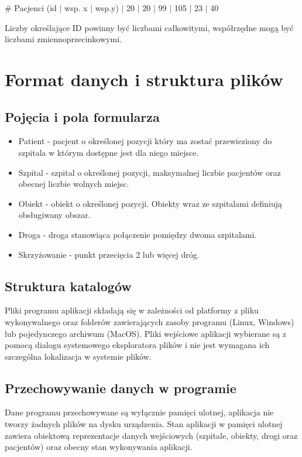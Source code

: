 \documentclass{article}
\begin{document}
\begin{tcolorbox}[title={Przykładowy plik zawierający dane pacjentów potrzebujących wolnego łóżka w szpitalu.}]
\# Pacjenci (id $|$ wsp. x $|$ wsp.y)
 $|$ 20 $|$ 20
 $|$ 99 $|$ 105
 $|$ 23 $|$ 40
\end{tcolorbox}
Liczby określające ID powinny być liczbami całkowitymi, współrzędne mogą być liczbami zmiennoprzecinkowymi.

\section{Format danych i struktura plików}
\subsection{Pojęcia i pola formularza}
\begin{itemize}
    \item Patient - pacjent o określonej pozycji który ma zostać przewieziony do szpitala w którym dostępne jest dla niego miejsce.
    \item Szpital - szpital o określonej pozycji, maksymalnej liczbie pacjentów oraz obecnej liczbie wolnych miejsc.
    \item Obiekt - obiekt  o określonej pozycji. Obiekty wraz ze szpitalami definiują obsługiwany obszar.
    \item Droga - droga stanowiąca połączenie pomiędzy dwoma szpitalami.
    \item Skrzyżowanie - punkt przecięcia 2 lub więcej dróg.
\end{itemize}

\subsection{Struktura katalogów}
Pliki programu aplikacji składają się w zależności od platformy z pliku wykonywalnego oraz folderów zawierających zasoby programu (Linux, Windows) lub pojedynczego archiwum (MacOS). Pliki wejściowe aplikacji wybierane są z pomocą dialogu systemowego eksploratora plików i nie jest wymagana ich szczególna lokalizacja w systemie plików.
 
\subsection{Przechowywanie danych w programie}
Dane programu przechowywane są wyłącznie pamięci ulotnej, aplikacja nie tworzy żadnych plików na dysku urządzenia. Stan aplikacji w pamięci ulotnej zawiera obiektową reprezentacje danych wejściowych (szpitale, obiekty, drogi oraz pacjentów) oraz obecny stan wykonywania aplikacji.
\end{document}
